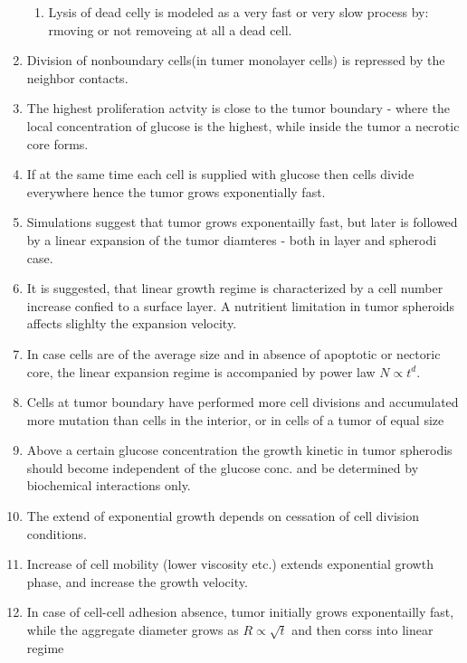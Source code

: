 \documentclass[10pt,a4paper]{article}
\begin{document}
\begin{enumerate}
\begin{enumerate}
  \item Lysis of dead celly is modeled as a very fast or very slow process by: rmoving or not removeing at all a dead cell.
 \end{enumerate}
 \item Division of nonboundary cells(in tumer monolayer cells) is repressed by the neighbor contacts.
 \item The highest proliferation actvity is close to the tumor boundary - where the local concentration of glucose is the highest, 
 while inside the tumor a necrotic core forms.
 \item If at the same time each cell is supplied with glucose then cells divide everywhere hence the tumor grows exponentially fast.
 \item Simulations suggest that tumor grows exponentailly fast, but later is followed by a linear expansion of the tumor diamteres - both in layer and spherodi case.
 \item It is suggested, that linear growth regime is characterized by a cell number increase confied to a surface layer. 
 A nutritient limitation in tumor spheroids affects slighlty the expansion velocity.
 \item In case cells are of the average size and in absence of apoptotic or nectoric core, the linear expansion regime is accompanied by power law $N \propto t^d$.
 \item Cells at tumor boundary have performed more cell divisions and accumulated more mutation than cells in the interior, or in cells of a tumor of equal 
 size 
 \item Above a certain glucose concentration the growth kinetic in tumor spherodis should become independent of the glucose conc. and be determined by biochemical interactions only.
 \item The extend of exponential growth depends on cessation of cell division conditions.
 \item Increase of cell mobility (lower viscosity etc.) extends exponential growth phase, and increase the growth velocity.
 \item In case of cell-cell adhesion absence, tumor initially grows exponentailly fast,  while the aggregate diameter grows as $R \propto \sqrt{t}$ and then corss into linear regime
\end{enumerate}
\end{document}
